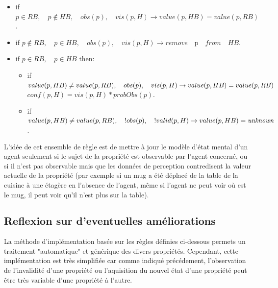 \documentclass[a4paper,11pt,twoside]{StyleThese}
\begin{document}
\begin{itemize}
\item if $p \in RB, \quad p\not\in HB,\quad obs(p),\quad vis(p,H) \rightarrow value(p,HB)=value(p,RB)$.
\item if $p \not \in RB,\quad p\in HB,\quad obs(p),\quad vis(p,H) \rightarrow remove\quad $p$ \quad from \quad HB$.
\item if $p\in RB,\quad p\in HB$ then:
	\begin{itemize}
      \item if $value(p,HB)\neq value(p,RB),\\ \quad obs(p),\quad vis(p,H) \rightarrow  value(p,HB)=value(p,RB)$ \\
      $conf(p,H)=vis(p,H)*probObs(p)$.
      \item if $value(p,HB)\neq value(p,RB),\\ \quad !obs(p),\quad !valid(p,H) \rightarrow  value(p,HB)=\textit{unknown}$.
	\end{itemize}
\end{itemize}

L'idée de cet ensemble de règle est de mettre à jour le modèle d'état mental d'un agent seulement si le sujet de la propriété est observable par l'agent concerné, ou si il n'est pas observable mais que les données de perception contredisent la valeur actuelle de la propriété (par exemple si un mug a été déplacé de la table de la cuisine à une étagère en l'absence de l'agent, même si l'agent ne peut voir où est le mug, il peut voir qu'il n'est plus sur la table).


\subsection{Reflexion sur d'eventuelles améliorations}
La méthode d'implémentation basée sur les règles définies ci-dessous permets un traitement "automatique" et générique des divers propriétés.
Cependant, cette implémentation est très simplifiée car comme indiqué précédement, 
l'observation de l'invalidité d'une propriété ou l'aquisition du nouvel état d'une propriété peut être très variable d'une propriété à l'autre.
\end{document}
